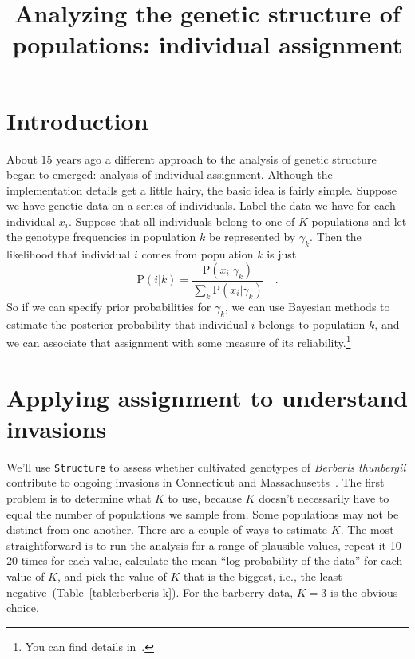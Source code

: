 \documentclass[12pt]{article}
\title{Analyzing the genetic structure of populations: individual assignment}
\begin{document}
\maketitle

\thispagestyle{first}

\section*{Introduction}

About 15 years ago a different approach to the analysis of genetic
structure began to emerged: analysis of individual
assignment. Although the implementation
details get a little hairy, the basic idea is fairly simple. Suppose
we have genetic data on a series of individuals. Label the data we
have for each individual $x_i$. Suppose that all individuals belong to
one of $K$ populations and let the genotype frequencies in population
$k$ be represented by $\gamma_k$. Then the likelihood that individual
$i$ comes from population $k$ is just
\[
\mbox{P}(i|k) = \frac{\mbox{P}(x_i|\gamma_k)}{\sum_k
  \mbox{P}(x_i|\gamma_k)} \quad .
\]
So if we can specify prior probabilities for $\gamma_k$, we can use
Bayesian methods to estimate the posterior probability that individual
$i$ belongs to population $k$, and we can associate that assignment
with some measure of its reliability.\footnote{You can find details
  in~\cite{Pritchard-etal-2000}.}

\section*{Applying assignment to understand invasions}

We'll use {\tt Structure} to assess whether cultivated genotypes of
{\it Berberis thunbergii\/} contribute to ongoing invasions in
Connecticut and
Massachusetts~\cite{Lubell-etal-2008}. The first problem is to determine what $K$
to use, because $K$ doesn't necessarily have to equal the number of
populations we sample from. Some populations may not be distinct from
one another. There are a couple of ways to estimate $K$. The most
straightforward is to run the analysis for a range of plausible
values, repeat it 10-20 times for each value, calculate the mean ``log
probability of the data'' for each value of $K$, and pick the value of
$K$ that is the biggest, i.e., the least
negative~(Table~\ref{table:berberis-k}). For the barberry data, $K=3$
is the obvious choice.
\end{document}
